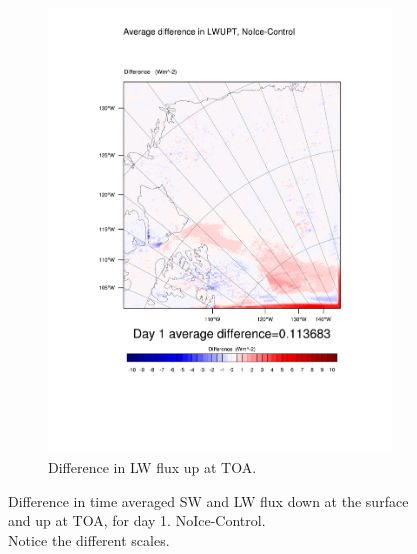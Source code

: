 \begin{figure}
\begin{subfigure}{0.48\textwidth}
		\includegraphics[width=\textwidth]{results/noice/diff_NoIce_LWUPT_Day1.pdf}
		\caption{Difference in LW flux up at TOA.}
		\label{subfig:lwup_r2Day1}
	\end{subfigure}
	\caption{Difference in time averaged SW and LW flux down at the surface and up at TOA, for day 1. NoIce-Control.\\Notice the different scales.}
	\label{fig:radiation_r2Day1}
\end{figure}


